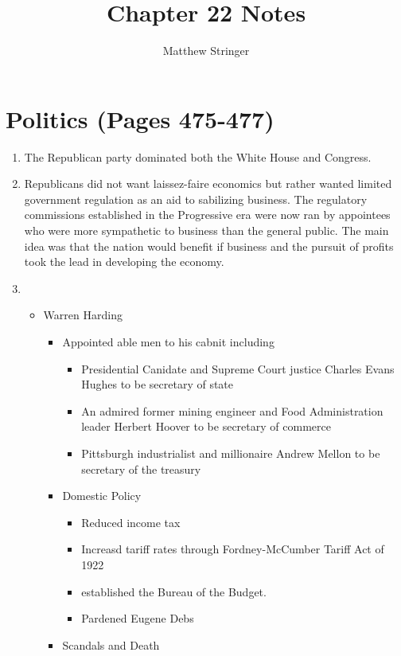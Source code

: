 \documentclass[12pt]{article} %
\title{Chapter 22 Notes} %
\author{Matthew Stringer} %
\begin{document}
\maketitle
\tableofcontents
\newpage

\section{Politics (Pages 475-477)}
\begin{enumerate}
	\item The Republican party dominated both the White House and Congress.
	\item Republicans did not want laissez-faire economics but rather wanted limited government regulation as an aid to sabilizing business.
		The regulatory commissions established in the Progressive era were now ran by appointees who were more sympathetic to business than
		the general public. The main idea was that the nation would benefit if business and the pursuit of profits took the lead in developing
		the economy.
	\item 
	\begin{itemize}
		\item Warren Harding
		\begin{itemize}
			\item Appointed able men to his cabnit including 
			\begin{itemize}
				\item Presidential Canidate and Supreme Court justice Charles Evans Hughes to be secretary of state
				\item An admired former mining engineer and Food Administration leader Herbert Hoover to be \newline secretary of commerce
				\item Pittsburgh industrialist and millionaire Andrew Mellon to be secretary of the treasury
			\end{itemize}
			\item Domestic Policy
			\begin{itemize}
				\item Reduced income tax
				\item Increasd tariff rates through Fordney-McCumber Tariff Act of 1922
				\item established the Bureau of the Budget.
				\item Pardened Eugene Debs
			\end{itemize}
			\item Scandals and Death
			\begin{itemize}

\end{itemize}
\end{itemize}
\end{itemize}
\end{enumerate}
\end{document}
